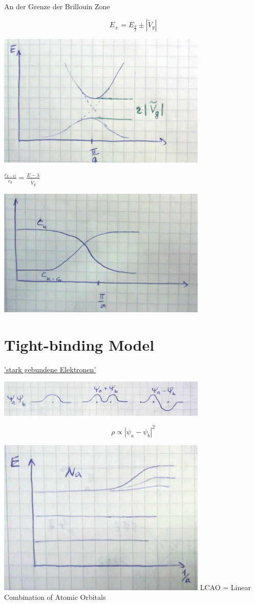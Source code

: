 An der Grenze der Brillouin Zone

\[ E_{\pm} = E_{\frac{g}{2}}\pm|\tilde V_g| \]

\includegraphics[width=0.75\textwidth]{kap06_37.png}

\(\frac{c_{k-G}}{c_k}=\frac{E-\lambda}{\tilde V_g}\)


\includegraphics[width=0.75\textwidth]{kap06_38.png}



\section{Tight-binding Model}

\underline{'stark gebundene Elektronen'}


\includegraphics[width=0.75\textwidth]{kap06_39.png}

\[\rho \propto |\psi_a-\psi_b|^2\]


\includegraphics[width=0.75\textwidth]{kap06_40.png}
LCAO = Linear Combination of Atomic Orbitals

